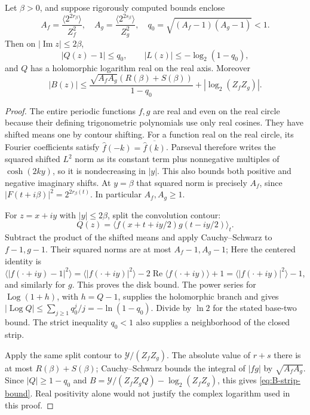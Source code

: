\begin{lemma}\label{lem:strip}
Let $\beta>0$, and suppose rigorously computed bounds enclose
\[
 A_f=\frac{\langle2^{2r_\beta}\rangle}{Z_f^2},\quad
 A_g=\frac{\langle2^{2s_\beta}\rangle}{Z_g^2},\quad
 q_0=\sqrt{(A_f-1)(A_g-1)}<1.
\]
Then on $|\operatorname{Im}z|\le2\beta$,
\[
 |Q(z)-1|\le q_0,
 \qquad |L(z)|\le-\log_2(1-q_0),
\]
and $Q$ has a holomorphic logarithm real on the real axis. Moreover
\begin{equation}\label{eq:B-strip-bound}
 |B(z)|\le
 \frac{\sqrt{A_fA_g}(R(\beta)+S(\beta))}{1-q_0}
       +|\log_2(Z_fZ_g)|.
\end{equation}
\end{lemma}
\begin{proof}
The entire periodic functions $f,g$ are real and even on the real circle
because their defining trigonometric polynomials use only real cosines.
They have shifted means one by contour shifting. For a function real
on the real circle, its Fourier coefficients
satisfy $\widehat f(-k)=\overline{\widehat f(k)}$. Parseval therefore
writes the squared shifted $L^2$ norm as its constant term plus
nonnegative multiples of $\cosh(2ky)$, so it is nondecreasing in $|y|$.
This also bounds both positive and negative imaginary shifts.
At $y=\beta$ that squared norm is precisely $A_f$, since
$|F(t+i\beta)|^2=2^{2r_\beta(t)}$. In particular $A_f,A_g\ge1$.

For $z=x+iy$ with $|y|\le2\beta$, split the convolution contour:
\[
 Q(z)=\langle f(x+t+iy/2)g(t-iy/2)\rangle_t.
\]
Subtract the product of the shifted means and apply Cauchy--Schwarz
to $f-1,g-1$. Their squared norms are at most $A_f-1,A_g-1$;
Here the centered identity is
$\langle|f(\cdot+iy)-1|^2\rangle
=\langle|f(\cdot+iy)|^2\rangle-2\operatorname{Re}\langle f(\cdot+iy)\rangle+1
=\langle|f(\cdot+iy)|^2\rangle-1$, and similarly for $g$.
This proves the disk bound. The power series for $\operatorname{Log}(1+h)$,
with $h=Q-1$, supplies the holomorphic branch and gives
$|\operatorname{Log}Q|\le\sum_{j\ge1}q_0^j/j=-\ln(1-q_0)$.
Divide by $\ln2$ for the stated base-two bound. The strict inequality
$q_0<1$ also supplies a neighborhood of the closed strip.

Apply the same split contour to $\mathcal Y/(Z_fZ_g)$.
The absolute value of $r+s$ there is at most $R(\beta)+S(\beta)$;
Cauchy--Schwarz bounds the integral of $|fg|$ by $\sqrt{A_fA_g}$.
Since $|Q|\ge1-q_0$ and
$B=\mathcal Y/(Z_fZ_gQ)-\log_2(Z_fZ_g)$, this gives
\eqref{eq:B-strip-bound}. Real positivity alone would not justify
the complex logarithm used in this proof.
\end{proof}

